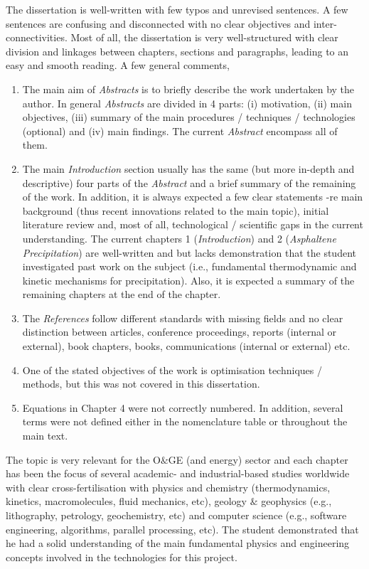 \documentclass[14pt,twoside]{report}
\begin{document}
The dissertation is well-written with few typos and unrevised sentences. A few sentences are confusing and disconnected with no clear objectives and inter-connectivities. Most of all, the dissertation is very well-structured with clear division and linkages between chapters, sections and paragraphs, leading to an easy and smooth reading. A few general comments,
\begin{enumerate}
%
\item The main aim of {\it Abstracts} is to briefly describe the work undertaken by the author. In general {\it Abstracts} are divided in 4 parts: (i) motivation, (ii) main objectives, (iii) summary of the main procedures / techniques / technologies (optional) and (iv) main findings. The current {\it Abstract} encompass all of them.
%
\item The main {\it Introduction} section usually has the same (but more in-depth and descriptive) four parts of the {\it Abstract} and a brief summary of the remaining of the work. In addition, it is always expected a few clear statements -re main background (thus recent innovations related to the main topic), initial literature review and, most of all, technological / scientific gaps in the current understanding. The current chapters 1 ({\it Introduction}) and 2 ({\it Asphaltene Precipitation}) are well-written and  but lacks demonstration that the student investigated past work on the subject (i.e., fundamental thermodynamic and kinetic mechanisms for precipitation). Also, it is expected a summary of the remaining chapters at the end of the chapter. 
%
\item The {\it References} follow different standards with missing fields and no clear distinction between articles, conference proceedings, reports (internal or external), book chapters, books, communications (internal or external) etc.  
%
\item One of the stated objectives of the work is optimisation techniques / methods, but this was not covered in this dissertation.
%
\item Equations in Chapter 4 were not correctly numbered. In addition, several terms were not defined either in the nomenclature table or throughout the main text.
% 
\end{enumerate}

The topic is very relevant for the O$\&$GE (and energy) sector and each chapter has been the focus of several academic- and industrial-based studies worldwide with clear cross-fertilisation with physics and chemistry (thermodynamics, kinetics, macromolecules, fluid mechanics, etc), geology $\&$ geophysics (e.g., lithography, petrology, geochemistry, etc) and computer science (e.g., software engineering, algorithms, parallel processing, etc).  The student demonstrated that he had a solid understanding of the main fundamental physics and engineering concepts involved in the technologies for this project.
\end{document}
